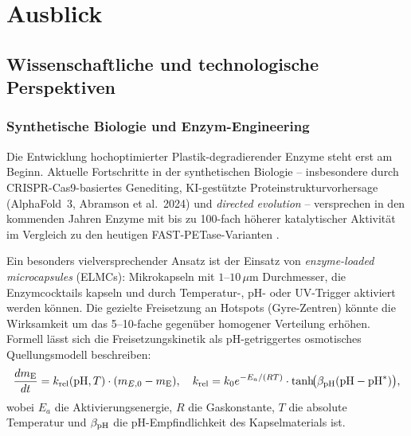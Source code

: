 ﻿\documentclass[12pt,a4paper]{article}
\theoremstyle{definition}
\theoremstyle{remark}
\begin{document}
\section{Ausblick}
\label{sec:ausblick}

\subsection{Wissenschaftliche und technologische Perspektiven}

\subsubsection{Synthetische Biologie und Enzym-Engineering}

Die Entwicklung hochoptimierter Plastik-degradierender Enzyme steht erst
am Beginn. Aktuelle Fortschritte in der synthetischen Biologie --
insbesondere durch CRISPR-Cas9-basiertes Genediting, KI-gest\"utzte
Proteinstrukturvorhersage (AlphaFold~3, Abramson et al.\ 2024) und
\textit{directed evolution} -- versprechen in den kommenden Jahren
Enzyme mit bis zu 100-fach h\"oherer katalytischer Aktivit\"at im Vergleich
zu den heutigen FAST-PETase-Varianten \cite{lu2022fast}.

Ein besonders vielversprechender Ansatz ist der Einsatz von
\textit{enzyme-loaded microcapsules} (ELMCs): Mikrokapseln mit
$1$--$10\,\mu\text{m}$ Durchmesser, die Enzymcocktails kapseln und
durch Temperatur-, pH- oder UV-Trigger aktiviert werden k\"onnen.
Die gezielte Freisetzung an Hotspots (Gyre-Zentren) k\"onnte die
Wirksamkeit um das 5--10-fache gegen\"uber homogener Verteilung
erh\"ohen. Formell l\"asst sich die Freisetzungskinetik als
pH-getriggertes osmotisches Quellungsmodell beschreiben:
\begin{equation}
  \frac{dm_{\rm E}}{dt} = k_{\rm rel}(\text{pH}, T) \cdot
  (m_{E,0} - m_{\rm E}), \quad
  k_{\rm rel} = k_0 e^{-E_a / (RT)} \cdot \tanh\!\bigl(\beta_{\rm pH}
  (\text{pH} - \text{pH}^*)\bigr),
\end{equation}
wobei $E_a$ die Aktivierungsenergie, $R$ die Gaskonstante, $T$ die absolute
Temperatur und $\beta_{\rm pH}$ die pH-Empfindlichkeit des Kapselmaterials ist.
\end{document}
